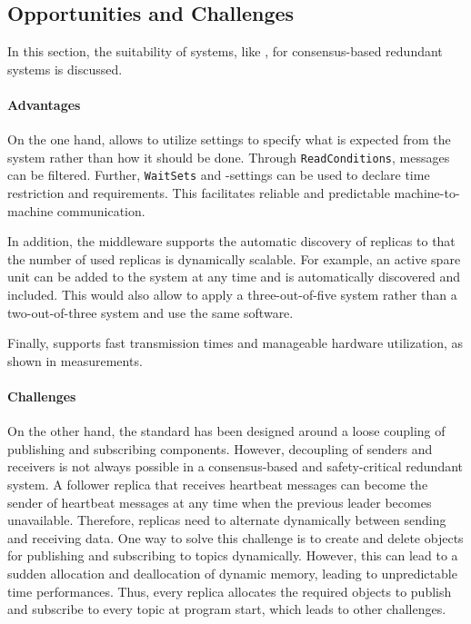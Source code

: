 \subsection{Opportunities and Challenges}

In this section, the suitability of  systems, like , for consensus-based redundant systems is discussed.

\paragraph{Advantages}
On the one hand,  allows to utilize  settings to specify what is expected from the system rather than how it should be done.
Through \texttt{ReadConditions}, messages can be filtered.
Further, \texttt{WaitSets} and -settings can be used to declare time restriction and requirements.
This facilitates reliable and predictable machine-to-machine communication.

In addition, the middleware supports the automatic discovery of replicas to that the number of used replicas is dynamically scalable.
For example, an active spare unit can be added to the system at any time and is automatically discovered and included.
This would also allow to apply a three-out-of-five system rather than a two-out-of-three system and use the same software.

Finally,  supports fast transmission times and manageable hardware utilization, as shown in measurements.

\paragraph{Challenges}
On the other hand, the  standard has been designed around a loose coupling of publishing and subscribing components.
However, decoupling of senders and receivers is not always possible in a consensus-based and safety-critical redundant system.
A follower replica that receives heartbeat messages can become the sender of heartbeat messages at any time when the previous leader becomes unavailable.
Therefore, replicas need to alternate dynamically between sending and receiving data.
One way to solve this challenge is to create and delete objects for publishing and subscribing to topics dynamically.
However, this can lead to a sudden allocation and deallocation of dynamic memory, leading to unpredictable time performances.
Thus, every replica allocates the required objects to publish and subscribe to every topic at program start, which leads to other challenges.
\\

